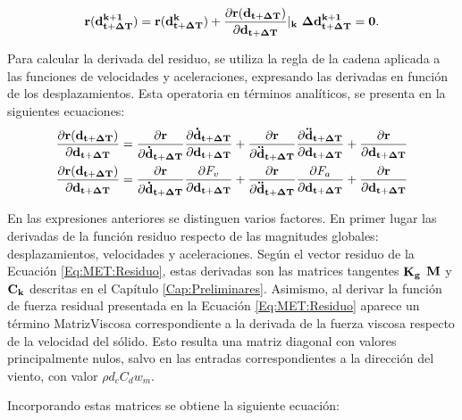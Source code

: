 \begin{equation}\label{Eq:MET:Residuo}
\bf{r}(\bf{d}^{k+1}_{t+\Delta T})=\bf{r}(\bf{d}^k_{t+\Delta T}) +
\frac{\partial  \bf{r}(\bf{d}_{t+\Delta T})}{\partial
	\bf{d}_{t+\Delta T}}|_k~\Delta \bf{d}^{k+1}_{t+\Delta T}=0.
\end{equation}

Para calcular la derivada del residuo, se utiliza la regla de la cadena aplicada a las funciones de velocidades y aceleraciones, expresando las derivadas en función de los desplazamientos. Esta operatoria en términos analíticos, se presenta en la siguientes ecuaciones: 
\begin{equation}\label{Eq:MET:DerivadaResiduo}
\begin{split}
	\frac{\partial  \bf{r}(\bf{d}_{t+\Delta T})}{\partial
		\bf{d}_{t+\Delta T}}&=\frac{\partial  \bf{r}}{\partial
		\bf{\dot{d}}_{t+\Delta T}}\frac{\partial 
		\bf{\bf{\dot{d}}_{t+\Delta T}}}{\partial \bf{{d}}_{t+\Delta T}}+ \frac{\partial 
		\bf{r}}{\partial \bf{\ddot{d}}_{t+\Delta T}}\frac{\partial 
		\bf{\bf{\ddot{d}}_{t+\Delta T}}}{\partial \bf{{d}}_{t+\Delta T}}+\frac{\partial 
		\bf{r}}{\partial \bf{{d}}_{t+\Delta T}}\\
	\frac{\partial  \bf{r}(\bf{d}_{t+\Delta T})}{\partial \bf{d}_{t+\Delta T}}&= \frac{\partial  \bf{r}}{\partial\bf{\dot{d}}_{t+\Delta T}}\frac{\partial F_v}{\partial \bf{{d}}_{t+\Delta T}}+\frac{\partial  \bf{r}}{\partial\bf{\ddot{d}}_{t+\Delta T}}\frac{\partial F_a}{\partial \bf{{d}}_{t+\Delta T}}+\frac{\partial 
		\bf{r}}{\partial \bf{{d}}_{t+\Delta T}}
\end{split}
\end{equation}

En las expresiones anteriores se distinguen varios factores. En primer lugar las derivadas de la función residuo respecto de las magnitudes globales: desplazamientos, velocidades y aceleraciones. Según el vector residuo de la Ecuación \eqref{Eq:MET:Residuo}, estas derivadas son las matrices tangentes $\bf{K_g}$ $\bf{M}$ y $\bf{C_k}$ descritas en el Capítulo \ref{Cap:Preliminares}. Asimismo, al derivar la función de fuerza residual presentada en la Ecuación \eqref{Eq:MET:Residuo} aparece un término \gls{MatrizViscosa} correspondiente a la derivada de la fuerza viscosa respecto de la velocidad del sólido. Esto resulta una matriz diagonal con valores principalmente nulos, salvo en las entradas correspondientes a la dirección del viento, con valor $\rho d_c C_d w_m$.

Incorporando estas matrices se obtiene la siguiente ecuación:

